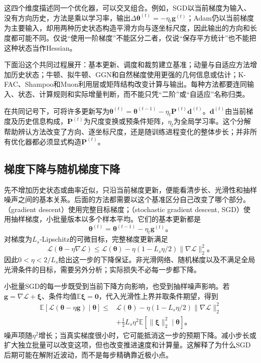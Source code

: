 这四个维度描述同一个优化器，可以交叉组合。例如，SGD以当前梯度为输入、没有方向历史，方法是乘以学习率，输出$\Delta\bm\theta^{(t)}=-\eta_t\bm g^{(t)}$；Adam仍以当前梯度为主要输入，却用两种历史状态构造平滑方向与逐坐标尺度，因此输出的方向和长度都可能不同。仅说“使用一阶梯度”不能区分二者，仅说“保存平方统计”也不能把这种状态当作Hessian。

下面沿这个共同过程展开：基本更新、调度和裁剪建立基准；动量与自适应方法增加历史状态；牛顿、拟牛顿、GGN和自然梯度使用更强的几何信息或估计；K-FAC、Shampoo和Muon利用层或矩阵结构改变计算与输出。每种方法都要连同输入、状态、计算规则和实际增量判断，而不能只凭“二阶”或“自适应”名称归类。

在共同记号下，可将许多更新写为$\bm\theta^{(t)}=\bm\theta^{(t-1)}-\eta_t\bm P^{(t)}\bm d^{(t)}$。$\bm d^{(t)}$由当前梯度及历史信息构成，$\bm P^{(t)}$为尺度变换或预条件矩阵，$\eta_t$为全局学习率。这个分解帮助辨认方法改变了方向、逐坐标尺度，还是随训练进程变化的整体步长；并非所有优化器都必须显式构造$\bm P^{(t)}$。

\subsection{梯度下降与随机梯度下降}
\label{sec:training-gradient-schedules}

先不增加历史状态或曲率近似，只沿当前梯度更新，便能看清步长、光滑性和抽样噪声之间的基本关系。后面的方法都需要以这个基准区分自己改变了哪个部分。（gradient descent）使用完整目标梯度；（stochastic gradient descent, SGD）使用抽样梯度，小批量版本以多个样本平均。它们的基本更新都是
\begin{equation}
  \bm\theta^{(t)}=\bm\theta^{(t-1)}-\eta_t\bm g^{(t)}\text{。}
  \label{eq:training-sgd}
\end{equation}
对梯度为$L_s$-Lipschitz的可微目标，完整梯度更新满足
\begin{equation}
  \mathcal L(\bm\theta-\eta\nabla\mathcal L)
  \leq\mathcal L(\bm\theta)
    -\eta(1-L_s\eta/2)\lVert\nabla\mathcal L\rVert_2^2\text{。}
  \label{eq:training-descent-bound}
\end{equation}
因此$0<\eta<2/L_s$给出这一步的下降保证。非光滑网络、随机梯度以及不满足全局光滑条件的目标，需要另外分析；实际损失不必每一步都下降。

小批量SGD的每一步既受到当前下降方向影响，也受到抽样噪声影响。若$\bm g=\nabla\mathcal L+\bm\xi$、条件均值$\mathbb E\bm\xi=\bm0$，代入光滑性上界并取条件期望，得到
\begin{equation}
  \begin{aligned}
  \mathbb E[\mathcal L(\bm\theta-\eta\bm g)\mid\bm\theta]
  \leq{}&\mathcal L(\bm\theta)
    -\eta(1-L_s\eta/2)\lVert\nabla\mathcal L\rVert_2^2\\
    &+\tfrac12L_s\eta^2\mathbb E[\lVert\bm\xi\rVert_2^2\mid\bm\theta]\text{。}
  \end{aligned}
  \label{eq:training-stochastic-descent}
\end{equation}
噪声项随$\eta^2$增长；当真实梯度很小时，它可能抵消这一步的预期下降。减小步长或扩大独立批量可以改变这项，但也改变推进速度和计算量。这解释了为什么SGD后期可能在解附近波动，而不是每步精确靠近极小点。

